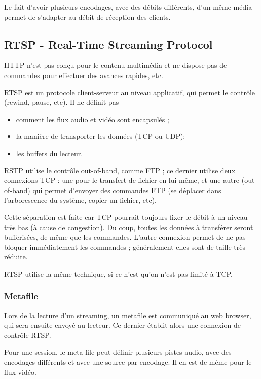\documentclass[10pt,a4paper]{report}
\begin{document}
			Le fait d'avoir plusieurs encodages, avec des débits différents, d'un même média permet de s'adapter au débit de réception des clients.
		
		
		\subsection{RTSP - Real-Time Streaming Protocol}
		
		HTTP n'est pas conçu pour le contenu multimédia et ne dispose pas de commandes pour effectuer des avances rapides, etc.
		
		RTSP est un protocole client-serveur au niveau applicatif, qui permet le contrôle (rewind, pause, etc). Il ne définit pas
		
		\begin{itemize}
			\item comment les flux audio et vidéo sont encapsulés ;
			\item la manière de transporter les données (TCP ou UDP);
			\item les buffers du lecteur.
		\end{itemize}
		
		RSTP utilise le contrôle out-of-band, comme FTP ; ce dernier utilise deux connexions TCP : une pour le transfert de fichier en lui-même, et une autre (out-of-band) qui permet d'envoyer des commandes FTP (se déplacer dans l'arborescence du système, copier un fichier, etc).
		
		Cette séparation est faite car TCP pourrait toujours fixer le débit à un niveau très bas (à cause de congestion). Du coup, toutes les données à transférer seront bufferisées, de même que les commandes. L'autre connexion permet de ne pas bloquer immédiatement les commandes ; généralement elles sont de taille très réduite.
		
		RTSP utilise la même technique, si ce n'est qu'on n'est pas limité à TCP.
		
		
			\subsubsection{Metafile}
			
			Lors de la lecture d'un streaming, un metafile est communiqué au web browser, qui sera ensuite envoyé au lecteur. Ce dernier établit alors une connexion de contrôle RTSP.
			
			Pour une session, le meta-file peut définir plusieurs pistes audio, avec des encodages différents et avec une source par encodage. Il en est de même pour le flux vidéo.
			
\end{document}
